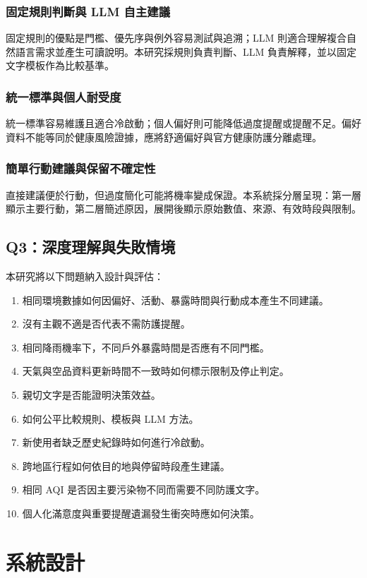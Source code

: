 \documentclass[conference]{IEEEtran}
\begin{document}
\subsubsection{固定規則判斷與 LLM 自主建議}
固定規則的優點是門檻、優先序與例外容易測試與追溯；LLM 則適合理解複合自然語言需求並產生可讀說明。本研究採規則負責判斷、LLM 負責解釋，並以固定文字模板作為比較基準。

\subsubsection{統一標準與個人耐受度}
統一標準容易維護且適合冷啟動；個人偏好則可能降低過度提醒或提醒不足。偏好資料不能等同於健康風險證據，應將舒適偏好與官方健康防護分離處理。

\subsubsection{簡單行動建議與保留不確定性}
直接建議便於行動，但過度簡化可能將機率變成保證。本系統採分層呈現：第一層顯示主要行動，第二層簡述原因，展開後顯示原始數值、來源、有效時段與限制。

\subsection{Q3：深度理解與失敗情境}
本研究將以下問題納入設計與評估：
\begin{enumerate}[leftmargin=*]
\item 相同環境數據如何因偏好、活動、暴露時間與行動成本產生不同建議。
\item 沒有主觀不適是否代表不需防護提醒。
\item 相同降雨機率下，不同戶外暴露時間是否應有不同門檻。
\item 天氣與空品資料更新時間不一致時如何標示限制及停止判定。
\item 親切文字是否能證明決策效益。
\item 如何公平比較規則、模板與 LLM 方法。
\item 新使用者缺乏歷史紀錄時如何進行冷啟動。
\item 跨地區行程如何依目的地與停留時段產生建議。
\item 相同 AQI 是否因主要污染物不同而需要不同防護文字。
\item 個人化滿意度與重要提醒遺漏發生衝突時應如何決策。
\end{enumerate}

\section{系統設計}
\end{document}
